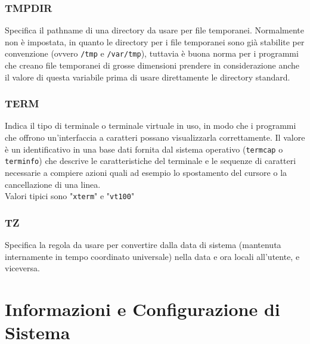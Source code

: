 \documentclass[11pt]{book}
\begin{document}
\subsection{TMPDIR}
Specifica il pathname di una directory da usare per file temporanei. Normalmente non è impostata, in quanto le directory per i file temporanei sono già stabilite per convenzione (ovvero \verb*|/tmp| e \verb*|/var/tmp|), tuttavia è buona norma per i programmi che creano file temporanei di grosse dimensioni prendere in considerazione anche il valore di questa variabile prima di usare direttamente le directory standard.

\subsection{TERM}
Indica il tipo di terminale o terminale virtuale in uso, in modo che i programmi che offrono un'interfaccia a caratteri possano visualizzarla correttamente. Il valore è un identificativo in una base dati fornita dal sistema operativo (\verb*|termcap| o \verb*|terminfo|) che descrive le caratteristiche del terminale e le sequenze di caratteri necessarie a compiere azioni quali ad esempio lo spostamento del cursore o la cancellazione di una linea.\\
Valori tipici sono "\verb*|xterm|" e "\verb*|vt100|"

\subsection{TZ}
Specifica la regola da usare per convertire dalla data di sistema (mantenuta internamente in tempo coordinato universale) nella data e ora locali all'utente, e viceversa. 


\chapter{Informazioni e Configurazione di Sistema}
\end{document}

